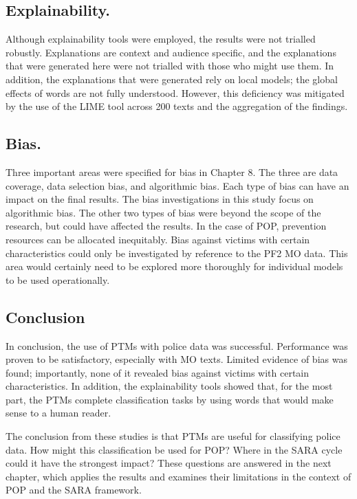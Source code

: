 \subsection{Explainability.} Although explainability tools were employed, the results were not trialled robustly. Explanations are context and audience specific, and the explanations that were generated here were not trialled with those who might use them. In addition, the explanations that were generated rely on local models; the global effects of words are not fully understood. However, this deficiency was mitigated by the use of the LIME tool across 200 texts and the aggregation of the findings.

\subsection{Bias.} Three important areas were specified for bias in Chapter 8. The three are data coverage, data selection bias, and algorithmic bias. Each type of bias can have an impact on the final results. The bias investigations in this study focus on algorithmic bias. The other two types of bias were beyond the scope of the research, but could have affected the results. In the case of POP, prevention resources can be allocated inequitably. Bias against victims with certain characteristics could only be investigated by reference to the PF2 MO data. This area would certainly need to be explored more thoroughly for individual models to be used operationally.


\subsection{Conclusion} In conclusion, the use of PTMs with police data was successful. Performance was proven to be satisfactory, especially with MO texts. Limited evidence of bias was found; importantly, none of it revealed bias against victims with certain characteristics. In addition, the explainability tools showed that, for the most part, the PTMs complete classification tasks by using words that would make sense to a human reader.

The conclusion from these studies is that PTMs are useful for classifying police data. How might this classification be used for POP? Where in the SARA cycle could it have the strongest impact? These questions are answered in the next chapter, which applies the results and examines their limitations in the context of POP and the SARA framework.

